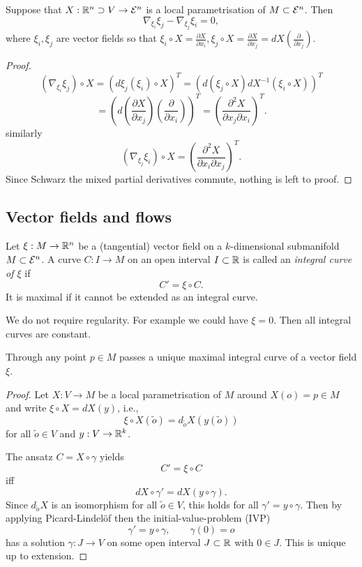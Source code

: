 \begin{lemma}
	Suppose that $X: \mathbb R^n \supset V \to \mathcal E^n$ is a local parametrisation of $M \subset \mathcal E^n$. Then
		\[ \nabla_{\xi_i}\xi_j - \nabla_{\xi_j}\xi_i=0, \]
	where $\xi_i,\xi_j$ are vector fields so that $\xi_i \circ X = \frac{\partial X}{\partial x_i} , \xi_j \circ X = \frac{\partial X}{\partial x_j}=dX\left( \frac \partial{\partial x_j} \right)$.
\end{lemma}

\begin{proof}
	\[ \left( \nabla_{\xi_i}\xi_j \right) \circ X = \left( d\xi_j (\xi_i)\circ X \right)^T
		= \left( d(\xi_j \circ X)dX^{-1} ( \xi_i \circ X) \right)^T\]
	\[ = \left( d\left( \frac{\partial X}{\partial x_j}\right)  \left( \frac \partial {\partial x_i}\right)\right)^T = \left( \frac {\partial^2 X}{\partial x_j \partial x_i}   \right)^T. \]
	similarly 
		\[ \left( \nabla_{\xi_j}\xi_i \right) \circ X = \left( \frac {\partial^2 X}{\partial x_i \partial x_j}   \right)^T . \]
	Since Schwarz the mixed partial derivatives commute, nothing is left to proof.
\end{proof}

\subsection{Vector fields and flows}

\begin{definition}
	Let $\xi : M \to \mathbb R^n$ be a (tangential) vector field on a $k$-dimensional submanifold $M \subset \mathcal E^n$. A curve $C: I \to M$ on an open interval $I \subset \mathbb R$ is called an \emph{integral curve of $\xi$} if
		\[ C' = \xi \circ C. \]
	It is maximal if it cannot be extended as an integral curve.
\end{definition}

\begin{remark}
	We do not require regularity. For example we could have $\xi=0$. Then all integral curves are constant.
\end{remark}

\begin{lemma}
	Through any point $p \in M$ passes a unique maximal integral curve of a vector field $\xi$.
\end{lemma}

\begin{proof}
	Let $X: V \to M$ be a local parametrisation of $M$ around $X(o)=p \in M$ and write $\xi \circ X = dX(y)$, i.e.,
		\[ \xi \circ X(\tilde o) = d_{\tilde o} X(y(\tilde o)) \]
	for all $\tilde o \in V$ and $y : V \to \mathbb R^k$.
	
	The ansatz $C= X \circ \gamma$ yields
		\[ C' = \xi \circ C  \]
	iff
		\[ dX \circ \gamma' = dX(y \circ \gamma). \]
	Since $d_{\tilde o}X$ is an isomorphism for all $\tilde o \in V$, this holds for all $\gamma' = y \circ \gamma$. Then by applying Picard-Lindelöf then the initial-value-problem (IVP) 
		\[ \gamma' = y \circ \gamma, \qquad \gamma(0)=o \]
	has a solution $\gamma: J \to V$ on some open interval $J \subset \mathbb R$ with $0 \in J$. This is unique up to extension.
\end{proof}


